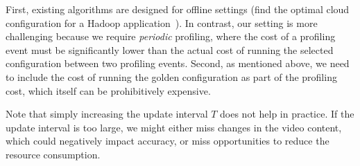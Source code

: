 
First, existing algorithms are designed for offline settings (\eg find the optimal cloud configuration for a Hadoop application~\cite{cherrypick}). In contrast, our setting is more challenging because we require {\em periodic} profiling, where the cost of a profiling event must be significantly lower than the actual cost of running the selected configuration between two profiling events. 
Second, as mentioned above, we need to include the cost of running the golden configuration as part of the profiling cost, which itself can be prohibitively expensive.

Note that simply increasing the update interval $T$ does not help in practice. If the update interval is too large, we might either miss changes in the video content, which could negatively impact  accuracy, or miss opportunities to reduce the resource consumption. 




